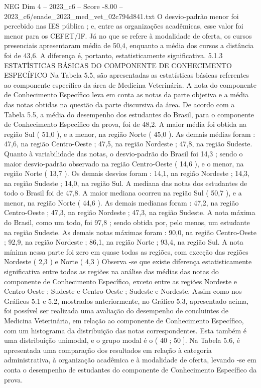 \begin{textsample}{NEG Dim 4 – 2023\_c6 – Score -8.00 – 2023\_c6/enade\_2023\_med\_vet\_02c794d841.txt}
O desvio-padrão menor foi percebido nas IES pública ; e, entre as organizações acadêmicas, esse valor foi menor para os CEFET/IF.
Já no que se refere à modalidade de oferta, os cursos presenciais apresentaram média de 50,4, enquanto a média dos cursos a distância foi de 43,6.
A diferença é, portanto, estatisticamente significativa. 5.1.3 ESTATÍSTICAS BÁSICAS DO COMPONENTE DE CONHECIMENTO ESPECÍFICO Na Tabela 5.5, são apresentadas as estatísticas básicas referentes ao componente específico da área de Medicina Veterinária.
A nota do componente de Conhecimento Específico leva em conta as notas da parte objetiva e a média das notas obtidas na questão da parte discursiva da área.
De acordo com a Tabela 5.5, a média do desempenho dos estudantes do Brasil, para o componente de Conhecimento Específico da prova, foi de 48,2.
A maior média foi obtida na região Sul ( 51,0 ), e a menor, na região Norte ( 45,0 ).
As demais médias foram : 47,6, na região Centro-Oeste ; 47,5, na região Nordeste ; 47,8, na região Sudeste.
Quanto à variabilidade das notas, o desvio-padrão do Brasil foi 14,3 ; sendo o maior desvio-padrão observado na região Centro-Oeste ( 14,6 ), e o menor, na região Norte ( 13,7 ).
Os demais desvios foram : 14,1, na região Nordeste ; 14,3, na região Sudeste ; 14,0, na região Sul.
A mediana das notas dos estudantes de todo o Brasil foi de 47,8.
A maior mediana ocorreu na região Sul ( 50,7 ), e a menor, na região Norte ( 44,6 ).
As demais medianas foram : 47,2, na região Centro-Oeste ; 47,3, na região Nordeste ; 47,3, na região Sudeste.
A nota máxima do Brasil, como um todo, foi 97,8 ; sendo obtida por, pelo menos, um estudante na região Sudeste.
As demais notas máximas foram : 90,0, na região Centro-Oeste ; 92,9, na região Nordeste ; 86,1, na região Norte ; 93,4, na região Sul.
A nota mínima nessa parte foi zero em quase todas as regiões, com exceção das regiões Nordeste ( 2,3 ) e Norte ( 4,3 ) Observa -se que existe diferença estatisticamente significativa entre todas as regiões na análise das médias das notas do componente de Conhecimento Específico, exceto entre as regiões Nordeste e Centro-Oeste ; Sudeste e Centro-Oeste ; Sudeste e Nordeste.
Assim como nos Gráficos 5.1 e 5.2, mostrados anteriormente, no Gráfico 5.3, apresentado acima, foi possível ser realizada uma avaliação do desempenho de concluintes de Medicina Veterinária, em relação ao componente de Conhecimento Específico, com um histograma da distribuição das notas correspondentes.
Esta também é uma distribuição unimodal, e o grupo modal é o ( 40 ; 50 ].
Na Tabela 5.6, é apresentada uma comparação dos resultados em relação à categoria administrativa, à organização acadêmica e à modalidade de oferta, levando -se em conta o desempenho de estudantes do componente de Conhecimento Específico da prova.

\end{textsample}
